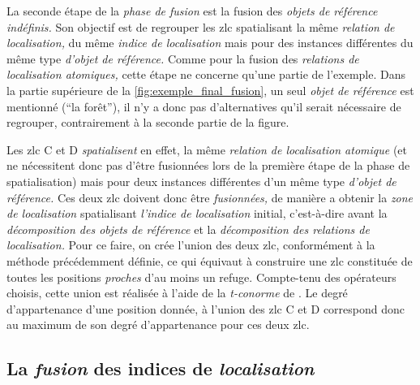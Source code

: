 La seconde étape de la \emph{phase de fusion} est la fusion des
\emph{objets de référence indéfinis.} Son objectif est de regrouper
les \ac{zlc} spatialisant la même \emph{relation de localisation,} du
même \emph{indice de localisation} mais pour des instances différentes
du même type \emph{d'objet de référence.} Comme pour la fusion des
\emph{relations de localisation atomiques,} cette étape ne concerne
qu'une partie de l'exemple. Dans la partie supérieure de la
\autoref{fig:exemple_final_fusion}, un seul \emph{objet de référence}
est mentionné (\enquote{la forêt}), il n'y a donc pas d'alternatives
qu'il serait nécessaire de regrouper, contrairement à la seconde
partie de la figure.

Les \ac{zlc} \textcolor{RdBu-9-8}{\textsf{C}} et
\textcolor{RdBu-9-9}{\textsf{D}} \emph{spatialisent} en effet, la même
\emph{relation de localisation atomique} (et ne nécessitent donc pas
d'être fusionnées lors de la première étape de la phase de
spatialisation) mais pour deux instances différentes d'un même type
\emph{d'objet de référence.} Ces deux \ac{zlc} doivent donc être
\emph{fusionnées,} de manière a obtenir la \emph{zone de localisation}
spatialisant \emph{l'indice de localisation} initial, c'est-à-dire
avant la \emph{décomposition des objets de référence} et la
\emph{décomposition des relations de localisation.} Pour ce faire, on
crée l'union des deux \ac{zlc}, conformément à la méthode précédemment
définie, ce qui équivaut à construire une \ac{zlc} constituée de
toutes les positions \emph{proches} d'au moins un refuge. Compte-tenu
des opérateurs choisis, cette union est réalisée à l'aide de la
\emph{t-conorme} de \textcite{Zadeh1965}. Le degré d’appartenance
d'une position donnée, à l'union des \ac{zlc}
\textcolor{RdBu-9-8}{\textsf{C}} et \textcolor{RdBu-9-9}{\textsf{D}}
correspond donc au maximum de son degré d'appartenance pour ces deux
\ac{zlc}.

\subsection{La \emph{fusion} des indices de \emph{localisation}}

